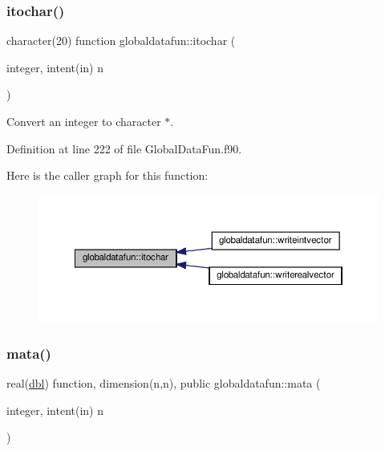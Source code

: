 \subsubsection{\texorpdfstring{itochar()}{itochar()}}
{\footnotesize\ttfamily character(20) function globaldatafun\+::itochar (\begin{DoxyParamCaption}\item[{integer, intent(in)}]{n }\end{DoxyParamCaption})\hspace{0.3cm}{\ttfamily [private]}}



Convert an integer to character $\ast$. 



Definition at line 222 of file Global\+Data\+Fun.\+f90.

Here is the caller graph for this function\+:\nopagebreak
\begin{figure}[H]
\begin{center}
\leavevmode
\includegraphics[width=350pt]{namespaceglobaldatafun_ae970761ddf59b4acff02030b21dbcd75_icgraph}
\end{center}
\end{figure}
\mbox{\label{namespaceglobaldatafun_abc2a555e679f86fd986da760d49b71bc}} 
\subsubsection{\texorpdfstring{mata()}{mata()}}
{\footnotesize\ttfamily real(\hyperlink{namespaceglobaldatafun_a5008801201dd34f2af8eae07756befb4}{dbl}) function, dimension(n,n), public globaldatafun\+::mata (\begin{DoxyParamCaption}\item[{integer, intent(in)}]{n }\end{DoxyParamCaption})}



